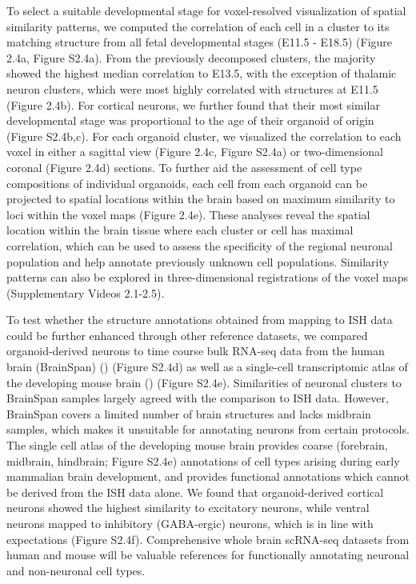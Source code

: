 To select a suitable developmental stage for voxel-resolved visualization of spatial similarity patterns, we computed the correlation of each cell in a cluster to its matching structure from all fetal developmental stages (E11.5 - E18.5) (Figure 2.4a, Figure S2.4a). From the previously decomposed clusters, the majority showed the highest median correlation to E13.5, with the exception of thalamic neuron clusters, which were most highly correlated with structures at E11.5 (Figure 2.4b). For cortical neurons, we further found that their most similar developmental stage was proportional to the age of their organoid of origin (Figure S2.4b,c). For each organoid cluster, we visualized the correlation to each voxel in either a sagittal view (Figure 2.4c, Figure S2.4a) or two-dimensional coronal (Figure 2.4d) sections. To further aid the assessment of cell type compositions of individual organoids, each cell from each organoid can be projected to spatial locations within the brain based on maximum similarity to loci within the voxel maps (Figure 2.4e). These analyses reveal the spatial location within the brain tissue where each cluster or cell has maximal correlation, which can be used to assess the specificity of the regional neuronal population and help annotate previously unknown cell populations. Similarity patterns can also be explored in three-dimensional registrations of the voxel maps (Supplementary Videos 2.1-2.5). 

To test whether the structure annotations obtained from mapping to ISH data could be further enhanced through other reference datasets, we compared organoid-derived neurons to time course bulk RNA-seq data from the human brain (BrainSpan) (\cite{thompson_high-resolution_2014}) (Figure S2.4d) as well as a single-cell transcriptomic atlas of the developing mouse brain (\cite{la_manno_molecular_2021}) (Figure S2.4e). Similarities of neuronal clusters to BrainSpan samples largely agreed with the comparison to ISH data. However, BrainSpan covers a limited number of brain structures and lacks midbrain samples, which makes it unsuitable for annotating neurons from certain protocols. The single cell atlas of the developing mouse brain provides coarse (forebrain, midbrain, hindbrain; Figure S2.4e) annotations of cell types arising during early mammalian brain development, and provides functional annotations which cannot be derived from the ISH data alone. We found that organoid-derived cortical neurons showed the highest similarity to excitatory neurons, while ventral neurons mapped to inhibitory (GABA-ergic) neurons, which is in line with expectations (Figure S2.4f). Comprehensive whole brain scRNA-seq datasets from human and mouse will be valuable references for functionally annotating neuronal and non-neuronal cell types.

